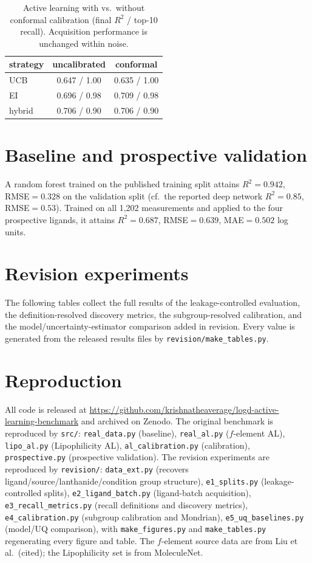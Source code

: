 \documentclass[journal=acsodf,manuscript=suppinfo]{achemso}
\begin{document}
\begin{table}[h]\centering
\caption{Active learning with vs.\ without conformal calibration (final $R^2$ /
top-10 recall). Acquisition performance is unchanged within noise.}
\begin{tabular}{lcc}
\toprule
strategy & uncalibrated & conformal \\
\midrule
UCB    & 0.647 / 1.00 & 0.635 / 1.00 \\
EI     & 0.696 / 0.98 & 0.709 / 0.98 \\
hybrid & 0.706 / 0.90 & 0.706 / 0.90 \\
\bottomrule
\end{tabular}
\end{table}

\section{Baseline and prospective validation}
A random forest trained on the published training split attains $R^2=0.942$,
RMSE$=0.328$ on the validation split (cf.\ the reported deep network $R^2=0.85$,
RMSE$=0.53$). Trained on all 1{,}202 measurements and applied to the four
prospective ligands, it attains $R^2=0.687$, RMSE$=0.639$, MAE$=0.502$ log units.

\section{Revision experiments}
The following tables collect the full results of the leakage-controlled evaluation,
the definition-resolved discovery metrics, the subgroup-resolved calibration, and the
model/uncertainty-estimator comparison added in revision. Every value is generated
from the released results files by \texttt{revision/make\_tables.py}.






\section{Reproduction}
All code is released at
\url{https://github.com/krishnatheaverage/logd-active-learning-benchmark} and archived
on Zenodo. The original benchmark is reproduced by \texttt{src/}: \texttt{real\_data.py}
(baseline), \texttt{real\_al.py} ($f$-element AL), \texttt{lipo\_al.py} (Lipophilicity
AL), \texttt{al\_calibration.py} (calibration), \texttt{prospective.py} (prospective
validation). The revision experiments are reproduced by \texttt{revision/}:
\texttt{data\_ext.py} (recovers ligand/source/lanthanide/condition group structure),
\texttt{e1\_splits.py} (leakage-controlled splits), \texttt{e2\_ligand\_batch.py}
(ligand-batch acquisition), \texttt{e3\_recall\_metrics.py} (recall definitions and
discovery metrics), \texttt{e4\_calibration.py} (subgroup calibration and Mondrian),
\texttt{e5\_uq\_baselines.py} (model/UQ comparison), with \texttt{make\_figures.py} and
\texttt{make\_tables.py} regenerating every figure and table. The $f$-element source
data are from Liu et al.\ (cited); the Lipophilicity set is from MoleculeNet.
\end{document}
